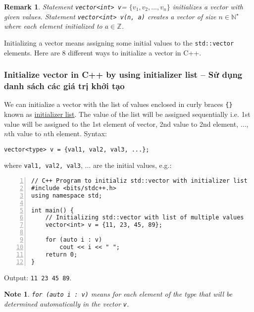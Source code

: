 \documentclass{article}
\newtheorem{note}{Note}
\newtheorem{remark}{Remark}
\begin{document}
\begin{remark}
	Statement \verb|vector<int> v|= $\{v_1,v_2,\ldots,v_n\}$ initializes a vector with given values. Statement \verb|vector<int> v(n, a)| creates a vector of size $n\in\mathbb{N}^\star$ where each element initialized to $a\in\mathbb{Z}$.
\end{remark}
Initializing a vector means assigning some initial values to the {\tt std::vector} elements. Here are 8 different ways to initialize a vector in C++.


\subsubsection{Initialize vector in C++ by using initializer list -- Sử dụng danh sách các giá trị khởi tạo}
We can initialize a vector with the list of values enclosed in curly braces {\tt\{\}} known as \href{https://www.geeksforgeeks.org/std-initializer_list-in-cpp-11/}{initializer list}. The value of the list will be assigned sequentially i.e. 1st value will be assigned to the 1st element of vector, 2nd value to 2nd element, $\ldots$, $n$th value to $n$th element. Syntax:
\begin{verbatim}
vector<type> v = {val1, val2, val3, ...};
\end{verbatim}
where {\tt val1, val2, val3}, $\ldots$ are the initial values, e.g.:
\begin{Verbatim}[numbers=left,xleftmargin=5mm]
// C++ Program to initializ std::vector with initializer list
#include <bits/stdc++.h>
using namespace std;

int main() {
    // Initializing std::vector with list of multiple values
    vector<int> v = {11, 23, 45, 89};
	
    for (auto i : v)
        cout << i << " ";
    return 0;
}
\end{Verbatim}
Output: {\tt 11 23 45 89}.
\begin{note}
	{\tt for (auto i : v)} means for each element of the type that will be determined automatically in the vector {\tt v}.
\end{note}

\end{document}
